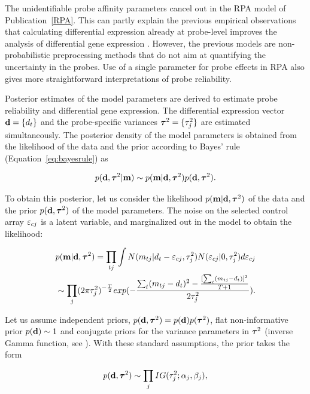 The unidentifiable probe affinity parameters cancel out in the RPA
model of Publication~\ref{RPA}. This can partly explain the previous
empirical observations that calculating differential expression
already at probe-level improves the analysis of differential gene
expression \citep{Zhang02, Elo05}. However, the previous models are
non-probabilistic preprocessing methods that do not aim at quantifying
the uncertainty in the probes. Use of a single parameter for probe
effects in RPA also gives more straightforward interpretations of
probe reliability.

Posterior estimates of the model parameters are derived to estimate
probe reliability and differential gene expression. The differential
expression vector \(\mathbf{d} = \{d_t\}\) and the probe-specific variances
\(\boldsymbol{\tau}^2 = \{\mathbf{\tau}_j^2\}\) are estimated simultaneously.  The posterior
density of the model parameters is obtained from the likelihood of the
data and the prior according to Bayes' rule
(Equation~\ref{eq:bayesrule}) as

\begin{equation}\label{eq:rpapost1}
    p(\mathbf{d}, \boldsymbol{\tau}^2 | \mathbf{m}) \sim p(\mathbf{m} | \mathbf{d}, \boldsymbol{\tau}^2) p(\mathbf{d}, \boldsymbol{\tau}^2).
\end{equation}

\noindent To obtain this posterior, let us consider the likelihood
\(p(\mathbf{m} | \mathbf{d}, \boldsymbol{\tau}^2)\) of the data and the prior \(p(\mathbf{d}, \boldsymbol{\tau}^2)\) of the
model parameters. The noise on the selected control array
\(\varepsilon_{cj}\) is a latent variable, and marginalized out in the model
to obtain the likelihood:

\begin{equation}
\begin{split}
p(\mathbf{m} | \mathbf{d}, \boldsymbol{\tau}^2) 
= \prod_{tj} \int N(m_{tj} | d_t - \varepsilon_{cj}, \mathbf{\tau}_j^2) N(\varepsilon_{cj} | 0, \mathbf{\tau}_j^2) d\varepsilon_{cj} \\
\sim \prod_j (2 \pi \mathbf{\tau}_j^2)^{-\frac{T}{2}} exp(- \frac{\sum_t (m_{tj} -d_t)^2 - \frac{ [\sum_t (m_{tj} - d_t)]^2} {T + 1}}{2 \mathbf{\tau}_j^2}).
\end{split}
\label{eq:datalikelihood}
\end{equation}

\noindent Let us assume independent priors, \(p(\mathbf{d},\boldsymbol{\tau}^2) = p(\mathbf{d})
p(\boldsymbol{\tau}^2)\), flat non-informative prior \(p(\mathbf{d}) \sim 1\) and
conjugate priors for the variance parameters in \(\boldsymbol{\tau}^2\) (inverse
Gamma function, see \citealt{Gelman03}). With these standard
assumptions, the prior takes the form

\begin{equation}\label{eq:rpaprior}
  p(\mathbf{d},\boldsymbol{\tau}^2) \sim \prod_j IG(\mathbf{\tau}_j^2; \alpha_j, \beta_j),
\end{equation}

